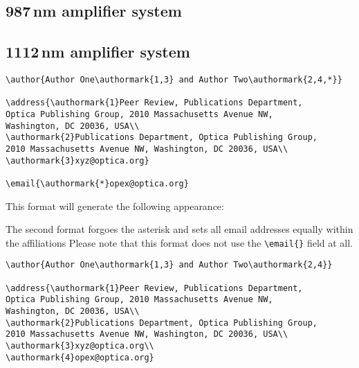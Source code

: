\documentclass{osa-article}
\begin{document}
\subsection{987\,nm amplifier system}

\subsection{1112\,nm amplifier system}



\begin{verbatim}
\author{Author One\authormark{1,3} and Author Two\authormark{2,4,*}}

\address{\authormark{1}Peer Review, Publications Department,
Optica Publishing Group, 2010 Massachusetts Avenue NW,
Washington, DC 20036, USA\\
\authormark{2}Publications Department, Optica Publishing Group,
2010 Massachusetts Avenue NW, Washington, DC 20036, USA\\
\authormark{3}xyz@optica.org}

\email{\authormark{*}opex@optica.org}
\end{verbatim}

This format will generate the following appearance:

\medskip

\author{Author One and Author Two}

\address{Peer Review, Publications Department,
Optica Publishing Group, 2010 Massachusetts Avenue NW,
Washington, DC 20036, USA\\
Publications Department, Optica Publishing Group,
2010 Massachusetts Avenue NW, Washington, DC 20036, USA\\
xyz@optica.org}


\medskip

The second format forgoes the asterisk and sets all email addresses equally within the affiliations
Please note that this format does not use the \verb+\email{}+ field at all.

\begin{verbatim}
\author{Author One\authormark{1,3} and Author Two\authormark{2,4}}

\address{\authormark{1}Peer Review, Publications Department,
Optica Publishing Group, 2010 Massachusetts Avenue NW,
Washington, DC 20036, USA\\
\authormark{2}Publications Department, Optica Publishing Group,
2010 Massachusetts Avenue NW, Washington, DC 20036, USA\\
\authormark{3}xyz@optica.org\\
\authormark{4}opex@optica.org}
\end{verbatim}
\end{document}
